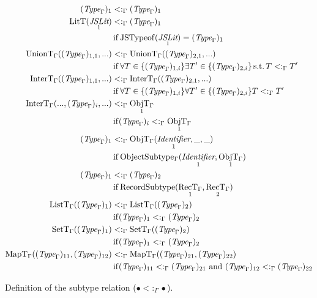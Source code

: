 \documentclass[12pt]{article}
\DeclareMathOperator{\LitT}{LitT}
\DeclareMathOperator{\JSLit}{\textit{JSLit}}
\DeclareMathOperator{\JSTypeof}{JSTypeof}
\DeclareMathOperator{\RecT}{RecT_\Gamma}
\DeclareMathOperator{\ObjT}{ObjT_\Gamma}
\DeclareMathOperator{\ListT}{ListT_\Gamma}
\DeclareMathOperator{\SetT}{SetT_\Gamma}
\DeclareMathOperator{\MapT}{MapT_\Gamma}
\DeclareMathOperator{\UnionT}{UnionT_\Gamma}
\DeclareMathOperator{\InterT}{InterT_\Gamma}
\DeclareMathOperator{\Identifier}{\textit{Identifier}}
\DeclareMathOperator{\Type}{{\textit{Type}_\Gamma}}
\DeclareMathOperator{\ObjectSubtype}{ObjectSubtype_\Gamma}
\DeclareMathOperator{\RecordSubtype}{RecordSubtype}
\DeclareMathOperator{\suchthat}{s.t.}
\newcommand{\subtype}{<:_\Gamma}
\begin{document}
\begin{figure}
\begin{mdframed}        
\begin{align*}
    (\Type)_1&\subtype(\Type)_1 \\
    \LitT(\JSLit_1)&\subtype(\Type)_1 \stfif \JSTypeof(\JSLit_1) = (\Type)_1 \\
    \UnionT((\Type)_{1,1}, ...)&\subtype\UnionT((\Type)_{2,1}, ...) 
    \stfif \forall T\in \{(\Type)_{1,i}\} \exists T' \in \{(\Type)_{2,i}\} \suchthat T\subtype T' \\
    \InterT((\Type)_{1,1}, ...)&\subtype\InterT((\Type)_{2,1}, ...) 
    \stfif \forall T\in \{(\Type)_{1,i}\} \forall T' \in \{(\Type)_{2,i}\} T\subtype T' \\
    \InterT(..., (\Type)_i, ...)&\subtype\ObjT_1 \stfif (\Type)_i\subtype\ObjT_1  \\
    (\Type)_1 &\subtype \ObjT(\Identifier_1, \_, \_) \stfif \ObjectSubtype(\Identifier_1, \ObjT_1)\\
    (\Type)_1&\subtype(\Type)_2 \stfif \RecordSubtype(\RecT_1, \RecT_2) \\
    \ListT((\Type)_1)&\subtype\ListT((\Type)_2) \stfif (\Type)_1\subtype(\Type)_2 \\
    \SetT((\Type)_1)&\subtype\SetT((\Type)_2) \stfif (\Type)_1\subtype(\Type)_2 \\
    \MapT((\Type)_{11}, (\Type)_{12})&\subtype\MapT((\Type)_{21}, (\Type)_{22}) \stfif (\Type)_{11}\subtype(\Type)_{21} \text{ and } (\Type)_{12}\subtype(\Type)_{22} 
\end{align*}
\end{mdframed}        
\caption{Definition of the subtype relation (\(\bullet\subtype\bullet\)).}
\label{subtype-definitions}
\end{figure}
\end{document}
